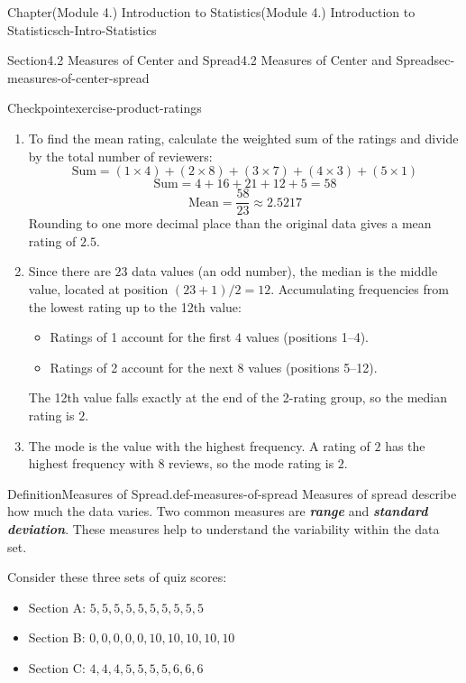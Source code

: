 \documentclass[oneside,10pt,]{book}
\newcommand{\ptxlistdisc}{\raisebox{0.3ex}{\textbullet}}
\newcommand{\alert}[1]{\textbf{\textit{#1}}}
\begin{document}
\begin{chapterptx}{Chapter}{(Module 4.) Introduction to Statistics}{}{(Module 4.) Introduction to Statistics}{}{}{ch-Intro-Statistics}
\begin{sectionptx}{Section}{4.2 Measures of Center and Spread}{}{4.2 Measures of Center and Spread}{}{}{sec-measures-of-center-spread}
\begin{inlineexercise}{Checkpoint}{}{exercise-product-ratings}
\begin{enumerate}[label={\alph*.}]
\item{}To find the mean rating, calculate the weighted sum of the ratings and divide by the total number of reviewers:%
\begin{equation*}
\text{Sum} = (1 \times 4) + (2 \times 8) + (3 \times 7) + (4 \times 3) + (5 \times 1)
\end{equation*}
%
\begin{equation*}
\text{Sum} = 4 + 16 + 21 + 12 + 5 = 58
\end{equation*}
%
\begin{equation*}
\text{Mean} = \frac{58}{23} \approx 2.5217
\end{equation*}
Rounding to one more decimal place than the original data gives a mean rating of \(2.5\).%
\item{}Since there are \(23\) data values (an odd number), the median is the middle value, located at position \((23 + 1) / 2 = 12\). Accumulating frequencies from the lowest rating up to the 12th value:%
\begin{itemize}[label=\ptxlistdisc]
\item{}Ratings of 1 account for the first \(4\) values (positions 1–4).%
\item{}Ratings of 2 account for the next \(8\) values (positions 5–12).%
\end{itemize}
The 12th value falls exactly at the end of the 2-rating group, so the median rating is \(2\).%
\item{}The mode is the value with the highest frequency. A rating of \(2\) has the highest frequency with \(8\) reviews, so the mode rating is \(2\).%
\end{enumerate}
%
\end{inlineexercise}%
\begin{definition}{Definition}{Measures of Spread.}{def-measures-of-spread}%
Measures of spread describe how much the data varies. Two common measures are \alert{range} and \alert{standard deviation}. These measures help to understand the variability within the data set.%
\end{definition}
Consider these three sets of quiz scores:%
\par
%
\begin{itemize}[label=\ptxlistdisc]
\item{}Section A: \(5, 5, 5, 5, 5, 5, 5, 5, 5, 5\)%
\item{}Section B: \(0, 0, 0, 0, 0, 10, 10, 10, 10, 10\)%
\item{}Section C: \(4, 4, 4, 5, 5, 5, 5, 6, 6, 6\)%
\end{itemize}

\end{sectionptx}
\end{chapterptx}
\end{document}
